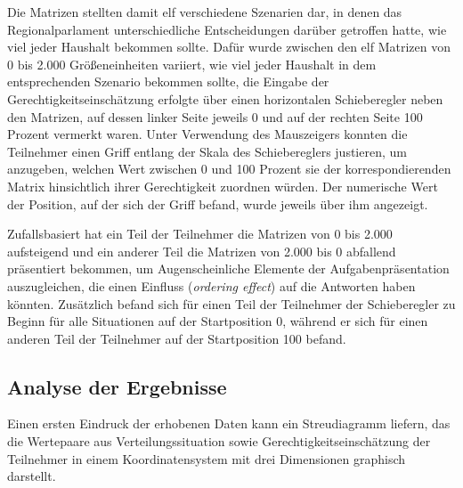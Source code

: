 \documentclass[a4paper]{thesis}
\begin{document}
Die Matrizen stellten damit elf verschiedene Szenarien dar, in denen das Regionalparlament unterschiedliche Entscheidungen darüber getroffen hatte, wie viel jeder Haushalt bekommen sollte. Dafür wurde zwischen den elf Matrizen von 0 bis 2.000 Größeneinheiten variiert, wie viel jeder Haushalt in dem entsprechenden Szenario bekommen sollte, die Eingabe der Gerechtigkeitseinschätzung erfolgte über einen horizontalen Schieberegler neben den Matrizen, auf dessen linker Seite jeweils 0 und auf der rechten Seite 100 Prozent vermerkt waren. Unter Verwendung des Mauszeigers konnten die Teilnehmer einen Griff entlang der Skala des Schiebereglers justieren, um anzugeben, welchen Wert zwischen 0 und 100 Prozent sie der korrespondierenden Matrix hinsichtlich ihrer Gerechtigkeit zuordnen würden. Der numerische Wert der Position, auf der sich der Griff befand, wurde jeweils über ihm angezeigt.

Zufallsbasiert hat ein Teil der Teilnehmer die Matrizen von 0 bis 2.000 aufsteigend und ein anderer Teil die Matrizen von 2.000 bis 0 abfallend präsentiert bekommen, um Augenscheinliche Elemente der Aufgabenpräsentation auszugleichen, die einen Einfluss (\textit{ordering effect}) auf die Antworten haben könnten. Zusätzlich befand sich für einen Teil der Teilnehmer der Schieberegler zu Beginn für alle Situationen auf der Startposition 0, während er sich für einen anderen Teil der Teilnehmer auf der Startposition 100 befand.

\subsection{Analyse der Ergebnisse}
Einen ersten Eindruck der erhobenen Daten kann ein Streudiagramm liefern, das die Wertepaare aus Verteilungssituation sowie Gerechtigkeitseinschätzung der Teilnehmer in einem Koordinatensystem mit drei Dimensionen graphisch darstellt.
\end{document}
